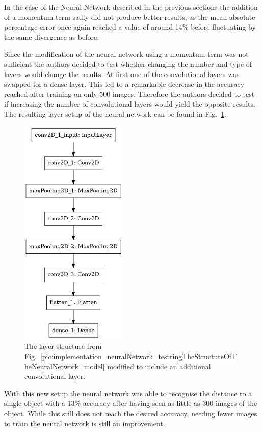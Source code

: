 In the case of the Neural Network described in the previous sections the addition of a momentum term sadly did not produce better results, as the mean absolute percentage error once again reached a value of around 14\% before fluctuating by the same divergence as before.

Since the modification of the neural network using a momentum term was not sufficient the authors decided to test whether changing the number and type of layers would change the results. At first one of the convolutional layers was swapped for a dense layer. This led to a remarkable decrease in the accuracy reached after training on only 500 images. Therefore the authors decided to test if increasing the number of convolutional layers would yield the opposite results. The resulting layer setup of the neural network can be found in Fig.~\ref{pic:implementation_neuralNetwork_modificationsToTheNN_model}.

\begin{figure}[h!]
	\centering
	\includegraphics[width=2in]{img/implementation_neuralNetwork_modificationsToTheNN_model.png}
	\caption{The layer structure from Fig.~\ref{pic:implementation_neuralNetwork_testringTheStructureOfTheNeuralNetwork_model} modified to include an additional convolutional layer.}
	\label{pic:implementation_neuralNetwork_modificationsToTheNN_model}
\end{figure}

With this new setup the neural network was able to recognise the distance to a single object with a 13\% accuracy after having seen as little as 300 images of the object. While this still does not reach the desired accuracy, needing fewer images to train the neural network is still an improvement.

